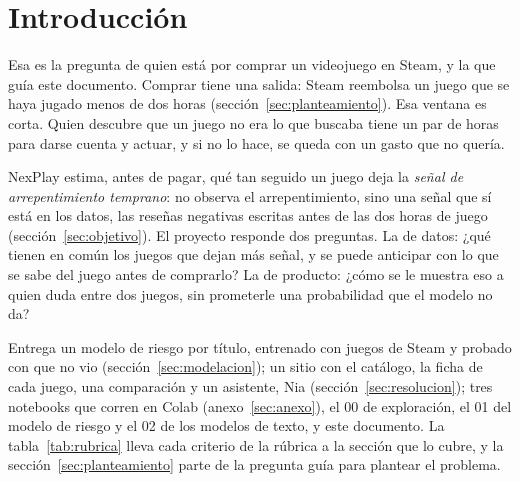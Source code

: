 \section{Introducción}\label{sec:introduccion}

\preguntaguia{} Esa es la pregunta de quien está por comprar un videojuego en Steam, y la que guía
este documento. Comprar tiene una salida: Steam reembolsa un juego que se haya jugado menos de dos
horas (sección~\ref{sec:planteamiento}). Esa ventana es corta. Quien descubre que un juego no era
lo que buscaba tiene un par de horas para darse cuenta y actuar, y si no lo hace, se queda con un
gasto que no quería.

NexPlay estima, antes de pagar, qué tan seguido un juego deja la \emph{señal de arrepentimiento
temprano}: no observa el arrepentimiento, sino una señal que sí está en los datos, las reseñas
negativas escritas antes de las dos horas de juego (sección~\ref{sec:objetivo}). El proyecto responde dos preguntas. La de
datos: ¿qué tienen en común los juegos que dejan más señal, y se puede anticipar con lo que se sabe
del juego antes de comprarlo? La de producto: ¿cómo se le muestra eso a quien duda entre dos juegos,
sin prometerle una probabilidad que el modelo no da?

Entrega un modelo de riesgo por título, entrenado con \cifraJuegosEntrenamiento{} juegos de Steam y
probado con \cifraJuegosExternos{} que no vio (sección~\ref{sec:modelacion}); un sitio con el
catálogo, la ficha de cada juego, una comparación y un asistente, Nia
(sección~\ref{sec:resolucion}); tres notebooks que corren en Colab (anexo~\ref{sec:anexo}), el
00 de exploración, el 01 del modelo de riesgo y el 02 de los modelos de texto, y este documento. La
tabla~\ref{tab:rubrica} lleva cada criterio de la rúbrica a la sección que lo cubre, y la
sección~\ref{sec:planteamiento} parte de la pregunta guía para plantear el problema.

